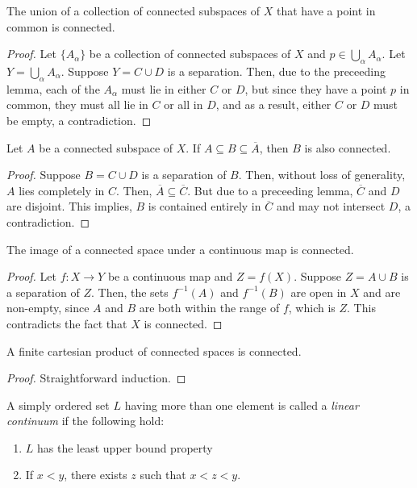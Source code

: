 \begin{theorem}
    The union of a collection of connected subspaces of $X$ that have a point in common is connected.
\end{theorem}
\begin{proof}
    Let $\{A_\alpha\}$ be a collection of connected subspaces of $X$ and $p\in\bigcup_\alpha A_\alpha$. Let $Y = \bigcup_\alpha A_\alpha$. Suppose $Y = C\cup D$ is a separation. Then, due to the preceeding lemma, each of the $A_\alpha$ must lie in either $C$ or $D$, but since they have a point $p$ in common, they must all lie in $C$ or all in $D$, and as a result, either $C$ or $D$ must be empty, a contradiction.
\end{proof}

\begin{theorem}
    Let $A$ be a connected subspace of $X$. If $A\subseteq B\subseteq\overline{A}$, then $B$ is also connected.
\end{theorem}
\begin{proof}
    Suppose $B = C\cup D$ is a separation of $B$. Then, without loss of generality, $A$ lies completely in $C$. Then, $\overline{A}\subseteq\overline{C}$. But due to a preceeding lemma, $\overline{C}$ and $D$ are disjoint. This implies, $B$ is contained entirely in $\overline{C}$ and may not intersect $D$, a contradiction.
\end{proof}

\begin{theorem}
    The image of a connected space under a continuous map is connected.
\end{theorem}
\begin{proof}
    Let $f:X\to Y$ be a continuous map and $Z = f(X)$. Suppose $Z = A\cup B$ is a separation of $Z$. Then, the sets $f^{-1}(A)$ and $f^{-1}(B)$ are open in $X$ and are non-empty, since $A$ and $B$ are both within the range of $f$, which is $Z$. This contradicts the fact that $X$ is connected.
\end{proof}

\begin{theorem}
    A finite cartesian product of connected spaces is connected.
\end{theorem}
\begin{proof}
    Straightforward induction.
\end{proof}

\begin{definition}
    A simply ordered set $L$ having more than one element is called a \textit{linear continuum} if the following hold:
    \begin{enumerate}
        \item $L$ has the least upper bound property 
        \item If $x < y$, there exists $z$ such that $x < z < y$.
    \end{enumerate}
\end{definition}

